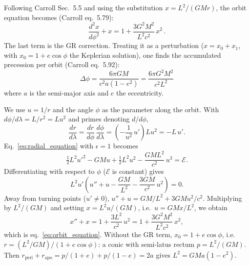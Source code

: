 Following Carroll Sec.~5.5 and using the substitution $x = L^2/(GMr)$,
the orbit equation becomes (Carroll eq.~5.79):
\begin{equation}
    \frac{d^2 x}{d\phi^2} + x = 1 + \frac{3G^2M^2}{L^2 c^2}\, x^2 \,.
    \label{eq:orbit_equation}
\end{equation}
The last term is the GR correction.  Treating it as a perturbation
($x = x_0 + x_1$, with $x_0 = 1 + e\cos\phi$ the Keplerian solution),
one finds the accumulated precession per orbit
(Carroll eq.~5.92):
\begin{equation}
    \boxed{
    \Delta\phi = \frac{6\pi G M}{c^2 a(1 - e^2)}
    = \frac{6\pi G^2 M^2}{c^2 L^2}
    }
    \label{eq:perihelion_precession}
\end{equation}
where $a$ is the semi-major axis and $e$ the eccentricity.

\begin{derivation}
We use $u = 1/r$ and the angle $\phi$ as the parameter along the orbit.  With
$d\phi/d\lambda = L/r^2 = Lu^2$ and primes denoting $d/d\phi$,
\[
\frac{dr}{d\lambda} = \frac{dr}{d\phi}\,\frac{d\phi}{d\lambda}
= \left(-\frac{1}{u^2}\,u'\right)Lu^2 = -L\,u' .
\]
Eq.~\eqref{eq:radial_equation} with $\epsilon = 1$ becomes
\[
\tfrac12L^2u'^2 - GMu + \tfrac12L^2u^2 - \frac{GML^2}{c^2}\,u^3 = \mathcal{E} .
\]
Differentiating with respect to $\phi$ ($\mathcal{E}$ is constant) gives
\[
L^2u'\left(u'' + u - \frac{GM}{L^2} - \frac{3GM}{c^2}\,u^2\right) = 0 .
\]
Away from turning points ($u' \neq 0$),
$u'' + u = GM/L^2 + 3GMu^2/c^2$.  Multiplying by $L^2/(GM)$ and setting
$x = L^2u/(GM)$, i.e.\ $u = GMx/L^2$, we obtain
\[
x'' + x = 1 + \frac{3L^2}{c^2}\,u^2 = 1 + \frac{3G^2M^2}{L^2c^2}\,x^2 ,
\]
which is eq.~\eqref{eq:orbit_equation}.  Without the GR term,
$x_0 = 1 + e\cos\phi$, i.e.\ $r = (L^2/GM)/(1 + e\cos\phi)$: a conic with
semi-latus rectum $p = L^2/(GM)$.  Then
$r_{\mathrm{peri}} + r_{\mathrm{apo}} = p/(1 + e) + p/(1 - e) = 2a$ gives
$L^2 = GMa(1 - e^2)$.
\end{derivation}

